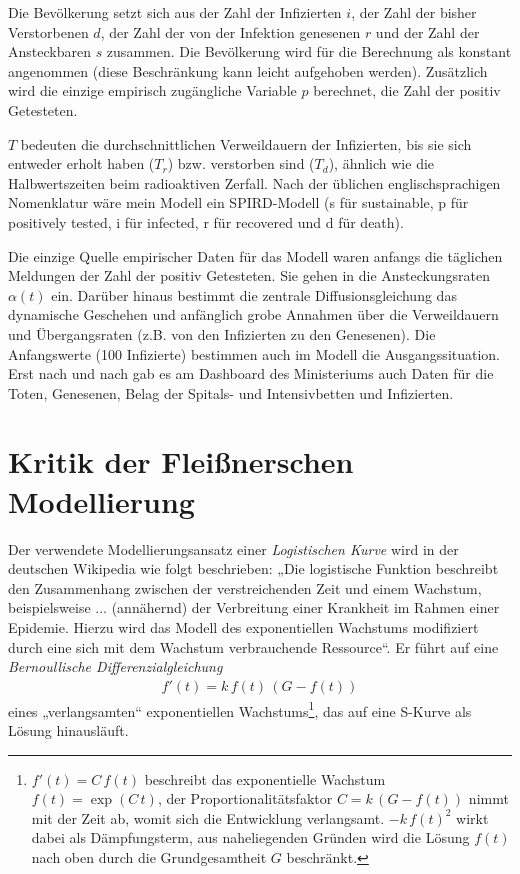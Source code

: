 \documentclass[a4paper,11pt]{article}
\begin{document}
Die Bevölkerung setzt sich aus der Zahl der Infizierten $i$, der Zahl der
bisher Verstorbenen $d$, der Zahl der von der Infektion genesenen $r$ und der
Zahl der Ansteckbaren $s$ zusammen. Die Bevölkerung wird für die Berechnung
als konstant angenommen (diese Beschränkung kann leicht aufgehoben werden).
Zusätzlich wird die einzige empirisch zugängliche Variable $p$ berechnet, die
Zahl der positiv Getesteten.

$T$ bedeuten die durchschnittlichen Verweildauern der Infizierten, bis sie
sich entweder erholt haben ($T_r$) bzw. verstorben sind ($T_d$), ähnlich wie
die Halbwertszeiten beim radioaktiven Zerfall. Nach der üblichen
englischsprachigen Nomenklatur wäre mein Modell ein SPIRD-Modell (s für
sustainable, p für positively tested, i für infected, r für recovered und d
für death).

Die einzige Quelle empirischer Daten für das Modell waren anfangs die
täglichen Meldungen der Zahl der positiv Getesteten. Sie gehen in die
Ansteckungsraten $\alpha(t)$ ein. Darüber hinaus bestimmt die zentrale
Diffusionsgleichung das dynamische Geschehen und anfänglich grobe Annahmen
über die Verweildauern und Übergangsraten (z.B. von den Infizierten zu den
Genesenen). Die Anfangswerte (100 Infizierte) bestimmen auch im Modell die
Ausgangssituation. Erst nach und nach gab es am Dashboard des Ministeriums
auch Daten für die Toten, Genesenen, Belag der Spitals- und Intensivbetten und
Infizierten.

\section{Kritik der Fleißnerschen Modellierung}

Der verwendete Modellierungsansatz einer \emph{Logistischen Kurve} wird in der
deutschen Wikipedia wie folgt beschrieben: „Die logistische Funktion
beschreibt den Zusammenhang zwischen der verstreichenden Zeit und einem
Wachstum, beispielsweise ... (annähernd) der Verbreitung einer Krankheit im
Rahmen einer Epidemie. Hierzu wird das Modell des exponentiellen Wachstums
modifiziert durch eine sich mit dem Wachstum verbrauchende Ressource“.
Er führt auf eine \emph{Bernoullische Differenzialgleichung}
\begin{gather*}
  f'(t)=k\,f(t)\,(G-f(t))
\end{gather*}
eines „verlangsamten“ exponentiellen Wachstums\footnote{$f'(t)=C\,f(t)$
  beschreibt das exponentielle Wachstum $f(t)=\exp(C\,t)$, der
  Proportionalitätsfaktor $C=k\,(G-f(t))$ nimmt mit der Zeit ab, womit sich
  die Entwicklung verlangsamt. $-k\,f(t)^2$ wirkt dabei als Dämpfungsterm, aus
  naheliegenden Gründen wird die Lösung $f(t)$ nach oben durch die
  Grundgesamtheit $G$ beschränkt.}, das auf eine S-Kurve als Lösung
hinausläuft.
\end{document}
